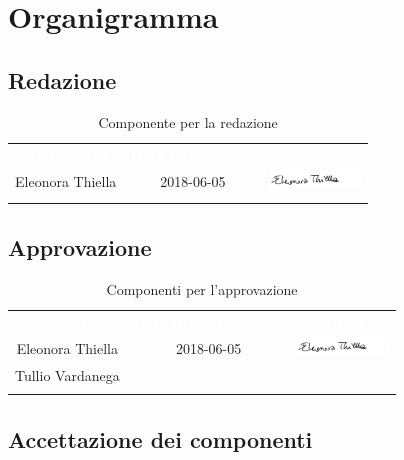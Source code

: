 \newpage
\renewcommand{\arraystretch}{1}

\section{Organigramma}

\subsection{Redazione}
\begin{longtable}{ c  c  c }
	\rowcolor{bluSOS}
	\textcolor{white}{\textbf{Nominativo}} & \textcolor{white}{\textbf{Data di redazione}} & \textcolor{white}{\textbf{Firma}}\\
	
	Eleonora Thiella & 2018-06-05 & \includegraphics[height=0.5cm]{img/Firme/EleonoraThiella.png}\\
	\caption{Componente per la redazione}  \\
\end{longtable}

\subsection{Approvazione}
\begin{longtable}{ c  c  c }
	\rowcolor{bluSOS}
	\textcolor{white}{\textbf{Nominativo}} & \textcolor{white}{\textbf{Data di approvazione}} & \textcolor{white}{\textbf{Firma}}\\
	
	Eleonora Thiella & 2018-06-05 & \includegraphics[height=0.5cm]{img/Firme/EleonoraThiella.png}  \\
	Tullio Vardanega & & \\
	\rowcolor{white}\caption{Componenti per l'approvazione}\\
\end{longtable}

\subsection{Accettazione dei componenti}

